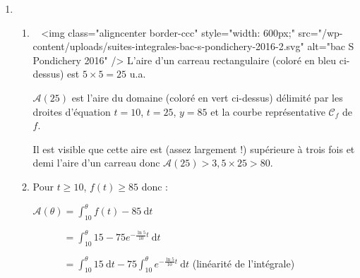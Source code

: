 \begin{corrige}
\begin{enumerate}
\begin{enumerate}
$$               \item
               Comme $f$ est strictement croissante sur $[0~;~+ \infty[$ :
               \par
               $t \geqslant 10 \Rightarrow f(t) \geqslant f(10)$
               \par
               Or :
               \par
               $f(10)=100-75{e}^{- \frac{\ln 5}{10} \times 10}$
               \par
               $\phantom{f(10)}=100-75{e}^{-\ln 5}$
               \par
               $\phantom{f(10)}=100-\frac{75}{{e}^{\ln 5}}$
               \par
               $\phantom{f(10)}=100-\frac{75}{5}=85$
               \par
               Donc pour tout $t \in [0~;~+ \infty[$, $f(t) \geqslant 85$.
          \end{enumerate}
          \item
          \begin{enumerate}
               \item
               ~
               <img class="aligncenter border-ccc" style="width: 600px;" src="/wp-content/uploads/suites-integrales-bac-s-pondichery-2016-2.svg" alt="bac S Pondichery 2016" />
               L'aire d'un carreau rectangulaire (coloré en bleu ci-dessus) est $5 \times 5 = 25$ u.a.
               \par
               $\mathcal{A}(25)$ est l'aire du domaine (coloré en vert ci-dessus) délimité par les droites d'équation $t = 10$, $t = 25$, $y = 85$ et la courbe représentative $\mathscr{C}_f$ de $f$.
               \par
               Il est visible que cette aire est (assez largement !) supérieure à trois fois et demi l'aire d'un carreau donc $\mathcal{A}(25)  > 3,5 \times 25  >  80$.
               \item
               Pour $t \geqslant 10$, $f(t) \geqslant 85$ donc :
               \par
               $\mathcal{A}(\theta) = \int_{10}^{\theta} f(t)-85\:\text{d}t$
               \par
               $\phantom{\mathcal{A}(\theta)} = \int_{10}^{\theta} 15-75{e}^{- \frac{\ln 5}{10}t}\:\text{d}t$
               \par
               $\phantom{\mathcal{A}(\theta)} = \int_{10}^{\theta} 15\:\text{d}t-75\int_{10}^{\theta}{e}^{-\frac{\ln 5}{10}t}\:\text{d}t$ (linéarité de l'intégrale)

\end{enumerate}
\end{enumerate}
\end{corrige}

